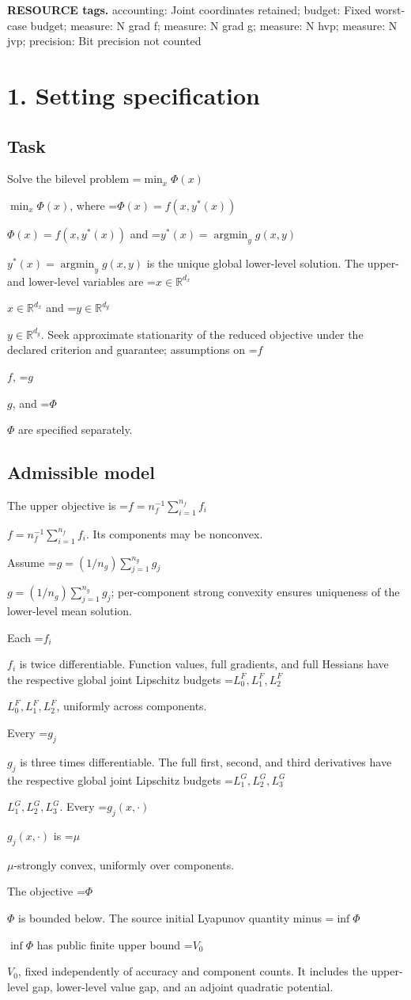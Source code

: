 \documentclass[10pt,a4paper]{article}
\newcommand{\AtlasMath}[1]{\par\begingroup\centering\setbox0=\hbox{$\displaystyle #1$}\ifdim\wd0>1.4\linewidth\typeout{ATLAS WIDE FORMULA: \the\wd0}\fi\ifdim\wd0>\linewidth\resizebox{\linewidth}{!}{\box0}\else\box0\fi\par\endgroup}
\newcommand{\AtlasInlineMath}[1]{\begingroup\setbox0=\hbox{$#1$}\ifdim\wd0>.4\linewidth\endgroup\AtlasMath{#1}\else\endgroup$#1$\fi}
\begin{document}
\textbf{RESOURCE tags.} accounting: Joint coordinates retained; budget: Fixed worst-case budget; measure: N grad f; measure: N grad g; measure: N hvp; measure: N jvp; precision: Bit precision not counted

\section{1. Setting specification}
\subsection{Task}
Solve the bilevel problem \AtlasInlineMath{\min_x\Phi(x)}, where \AtlasInlineMath{\Phi(x)=f(x,y^*(x))} and \AtlasInlineMath{y^*(x)=\operatorname*{argmin}_y g(x,y)} is the unique global lower-level solution. The upper- and lower-level variables are \AtlasInlineMath{x\in\mathbb{R}^{d_x}} and \AtlasInlineMath{y\in\mathbb{R}^{d_y}}. Seek approximate stationarity of the reduced objective under the declared criterion and guarantee; assumptions on \AtlasInlineMath{f}, \AtlasInlineMath{g}, and \AtlasInlineMath{\Phi} are specified separately.

\subsection{Admissible model}
The upper objective is \AtlasInlineMath{f=n_f^{-1}\sum_{i=1}^{n_f}f_i}. Its components may be nonconvex.

Assume \AtlasInlineMath{g=(1/n_g)\sum_{j=1}^{n_g}g_j}; per-component strong convexity ensures uniqueness of the lower-level mean solution.

Each \AtlasInlineMath{f_i} is twice differentiable. Function values, full gradients, and full Hessians have the respective global joint Lipschitz budgets \AtlasInlineMath{L^F_0,L^F_1,L^F_2}, uniformly across components.

Every \AtlasInlineMath{g_j} is three times differentiable. The full first, second, and third derivatives have the respective global joint Lipschitz budgets \AtlasInlineMath{L^G_1,L^G_2,L^G_3}. Every \AtlasInlineMath{g_j(x,\cdot)} is \AtlasInlineMath{\mu}-strongly convex, uniformly over components.

The objective \AtlasInlineMath{\Phi} is bounded below. The source initial Lyapunov quantity minus \AtlasInlineMath{\inf\Phi} has public finite upper bound \AtlasInlineMath{V_0}, fixed independently of accuracy and component counts. It includes the upper-level gap, lower-level value gap, and an adjoint quadratic potential.
\end{document}
